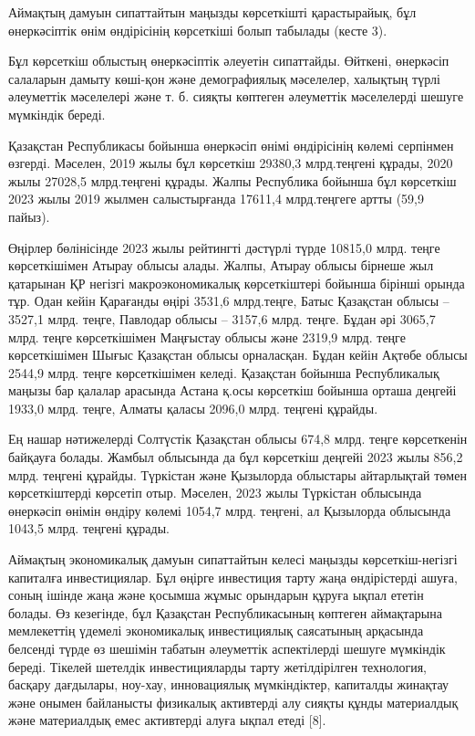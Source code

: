 \begin{multicols}{2}
Аймақтың дамуын сипаттайтын маңызды көрсеткішті қарастырайық, бұл
өнеркәсіптік өнім өндірісінің көрсеткіші болып табылады (кесте 3).

Бұл көрсеткіш облыстың өнеркәсіптік әлеуетін сипаттайды. Өйткені,
өнеркәсіп салаларын дамыту көші-қон және демографиялық мәселелер,
халықтың түрлі әлеуметтік мәселелері және т. б. сияқты көптеген
әлеуметтік мәселелерді шешуге мүмкіндік береді.

Қазақстан Республикасы бойынша өнеркәсіп өнімі өндірісінің көлемі
серпінмен өзгерді. Мәселен, 2019 жылы бұл көрсеткіш 29380,3 млрд.теңгені
құрады, 2020 жылы 27028,5 млрд.теңгені құрады. Жалпы Республика бойынша
бұл көрсеткіш 2023 жылы 2019 жылмен салыстырғанда 17611,4 млрд.теңгеге
артты (59,9 пайыз).

Өңірлер бөлінісінде 2023 жылы рейтингті дәстүрлі түрде 10815,0 млрд.
теңге көрсеткішімен Атырау облысы алады. Жалпы, Атырау облысы бірнеше
жыл қатарынан ҚР негізгі макроэкономикалық көрсеткіштері бойынша бірінші
орында тұр. Одан кейін Қарағанды өңірі 3531,6 млрд.теңге, Батыс
Қазақстан облысы -- 3527,1 млрд. теңге, Павлодар облысы -- 3157,6 млрд.
теңге. Бұдан әрі 3065,7 млрд. теңге көрсеткішімен Маңғыстау облысы және
2319,9 млрд. теңге көрсеткішімен Шығыс Қазақстан облысы орналасқан.
Бұдан кейін Ақтөбе облысы 2544,9 млрд. теңге көрсеткішімен келеді.
Қазақстан бойынша Республикалық маңызы бар қалалар арасында Астана қ.осы
көрсеткіш бойынша орташа деңгейі 1933,0 млрд. теңге, Алматы қаласы
2096,0 млрд. теңгені құрайды.

Ең нашар нәтижелерді Солтүстік Қазақстан облысы 674,8 млрд. теңге
көрсеткенін байқауға болады. Жамбыл облысында да бұл көрсеткіш деңгейі
2023 жылы 856,2 млрд. теңгені құрайды. Түркістан және Қызылорда
облыстары айтарлықтай төмен көрсеткіштерді көрсетіп отыр. Мәселен, 2023
жылы Түркістан облысында өнеркәсіп өнімін өндіру көлемі 1054,7 млрд.
теңгені, ал Қызылорда облысында 1043,5 млрд. теңгені құрады.

Аймақтың экономикалық дамуын сипаттайтын келесі маңызды
көрсеткіш-негізгі капиталға инвестициялар. Бұл өңірге инвестиция тарту
жаңа өндірістерді ашуға, соның ішінде жаңа және қосымша жұмыс орындарын
құруға ықпал ететін болады. Өз кезегінде, бұл Қазақстан Республикасының
көптеген аймақтарына мемлекеттің үдемелі экономикалық инвестициялық
саясатының арқасында белсенді түрде өз шешімін табатын әлеуметтік
аспектілерді шешуге мүмкіндік береді. Тікелей шетелдік инвестицияларды
тарту жетілдірілген технология, басқару дағдылары, ноу-хау, инновациялық
мүмкіндіктер, капиталды жинақтау және онымен байланысты физикалық
активтерді алу сияқты құнды материалдық және материалдық емес активтерді
алуға ықпал етеді {[}8{]}.
\end{multicols}

